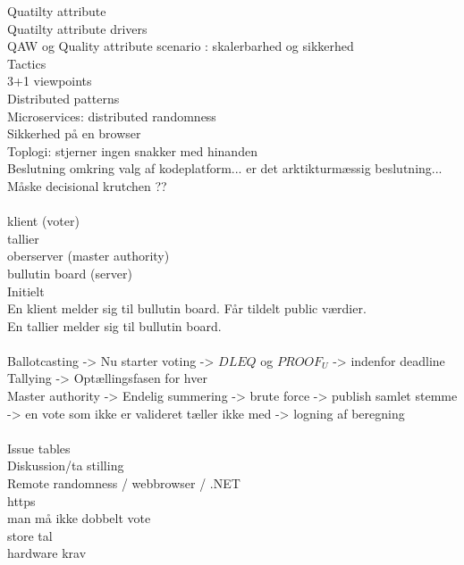 


\noindent
Quatilty attribute\\
Quatilty attribute drivers\\
QAW og Quality attribute scenario : skalerbarhed og sikkerhed\\
Tactics\\
3+1 viewpoints\\
Distributed patterns\\
Microservices: distributed randomness\\
Sikkerhed på en browser\\
Toplogi: stjerner ingen snakker med hinanden\\
Beslutning omkring valg af kodeplatform... er det arktikturmæssig beslutning... Måske decisional krutchen ??\\\\

\noindent
klient (voter)\\
tallier\\
oberserver (master authority)\\
bullutin board (server)\\
\noindent
Initielt\\
En klient melder sig til bullutin board. Får tildelt public værdier. \\
En tallier melder sig til bullutin board. \\\\
\noindent
Ballotcasting -> Nu starter voting ->  $DLEQ$ og $PROOF_U$ -> indenfor deadline\\
Tallying -> Optællingsfasen for hver \\
Master authority -> Endelig summering -> brute force -> publish samlet stemme -> en vote som ikke er valideret tæller ikke med -> logning af beregning \\\\

\noindent
Issue tables\\
Diskussion/ta stilling \\
Remote randomness / webbrowser / .NET\\
https\\
man må ikke dobbelt vote\\
store tal\\
hardware krav